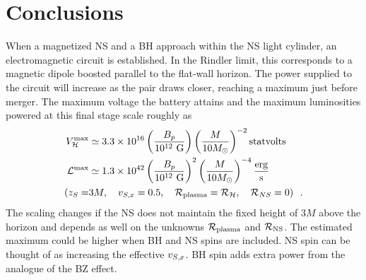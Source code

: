\section{Conclusions}
\label{Conclusions}

When a magnetized NS and a BH 
approach within the NS light cylinder, an electromagnetic circuit is established.
In the Rindler limit, this corresponds to a magnetic dipole boosted parallel to the flat-wall horizon.
The power supplied to the
circuit will increase as the pair draws closer, reaching a maximum just
before merger. 
The maximum voltage 
the battery attains
and the maximum luminosities powered at this final stage scale roughly as
\begin{align}
V^{\rm{max}}_\mathcal{H} &\simeq 3.3 \times 10^{16} \left( \frac{B_p}{10^{12}\ \rm{G}} \right) \left( \frac{M}{10 M_{\odot} } \right)^{-2} {\rm{statvolts}} \\ \nonumber
 \mathcal{L}^{\rm{max}} &\simeq 1.3 \times 10^{42} \left( \frac{B_p}{10^{12}\ \rm{G}} \right)^2 \left( \frac{M}{10 M_{\odot} } \right)^{-4} \frac{\rm{erg}}{\rm{s}} \\ 
 ( z_S = &3M, \quad v_{S, x}=0.5, \quad \mathcal{R}_{\rm{plasma}} =
 \mathcal{R}_{\mathcal{H}}, \quad \mathcal{R}_{NS} = 0   ) \nonumber \ \ .
\end{align}
The scaling changes if the NS does not maintain the fixed height of
$3M$ above the horizon and depends as well on the unknowns $\mathcal{R}_{\rm{plasma}}$ and
$\mathcal{R}_{\rm{NS}}$.
The estimated maximum could be higher when BH and NS spins are included. NS spin
can be thought of as increasing the effective $v_{S, x}$. BH spin adds
extra power from the analogue of the BZ effect. 

